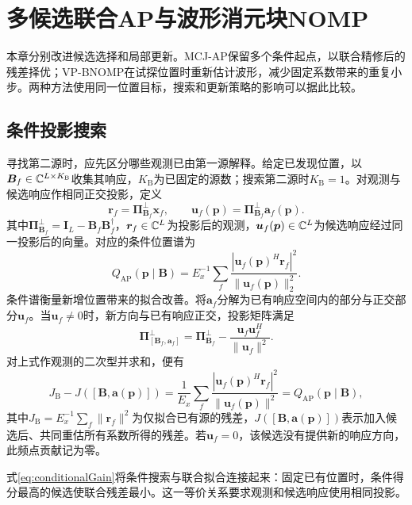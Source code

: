 \section{多候选联合AP与波形消元块NOMP}\label{sec:methods}
本章分别改进候选选择和局部更新。MCJ-AP保留多个条件起点，以联合精修后的残差择优；VP-BNOMP在试探位置时重新估计波形，减少固定系数带来的重复小步。两种方法使用同一位置目标，搜索和更新策略的影响可以据此比较。
\subsection{条件投影搜索}
寻找第二源时，应先区分哪些观测已由第一源解释。给定已发现位置，以$\bm B_f\in\mathbb C^{L\times K_{\mathrm B}}$收集其响应，$K_{\mathrm B}$为已固定的源数；搜索第二源时$K_{\mathrm B}=1$。对观测与候选响应作相同正交投影，定义
\begin{equation}
 \bm r_f=\bm\Pi_{\bm B_f}^{\perp}\bm x_f,\qquad
 \bm u_f(\bm p)=\bm\Pi_{\bm B_f}^{\perp}\bm a_f(\bm p).
\end{equation}
其中$\bm\Pi_{\bm B_f}^{\perp}=\bm I_L-\bm B_f\bm B_f^\dagger$，$\bm r_f\in\mathbb C^L$为投影后的观测，$\bm u_f(\bm p)\in\mathbb C^L$为候选响应经过同一投影后的向量。对应的条件位置谱为
\begin{equation}
 Q_{\mathrm{AP}}(\bm p\mid\bm B)
 =E_x^{-1}\sum_f\frac{|\bm u_f(\bm p)^H\bm r_f|^2}
 {\|\bm u_f(\bm p)\|_2^2}.\label{eq:conditional}
\end{equation}
条件谱衡量新增位置带来的拟合改善。将$\bm a_f$分解为已有响应空间内的部分与正交部分$\bm u_f$。当$\bm u_f\ne0$时，新方向与已有响应正交，投影矩阵满足
\begin{equation}
 \bm\Pi_{[\bm B_f,\bm a_f]}^{\perp}
 =\bm\Pi_{\bm B_f}^{\perp}
 -\frac{\bm u_f\bm u_f^H}{\|\bm u_f\|^2} .
\end{equation}
对上式作观测的二次型并求和，便有
\begin{equation}
 J_{\mathrm B}-J([\bm B,\bm a(\bm p)])
 =\frac1{E_x}\sum_f\frac{|\bm u_f(\bm p)^H\bm r_f|^2}
 {\|\bm u_f(\bm p)\|^2}
 =Q_{\mathrm{AP}}(\bm p\mid\bm B),\label{eq:conditionalGain}
\end{equation}
其中$J_{\mathrm B}=E_x^{-1}\sum_f\|\bm r_f\|^2$为仅拟合已有源的残差，$J([\bm B,\bm a(\bm p)])$表示加入候选后、共同重估所有系数所得的残差。若$\bm u_f=0$，该候选没有提供新的响应方向，此频点贡献记为零。

式\eqref{eq:conditionalGain}将条件搜索与联合拟合连接起来：固定已有位置时，条件得分最高的候选使联合残差最小\cite{ChenHudsonYao2002}。这一等价关系要求观测和候选响应使用相同投影。

